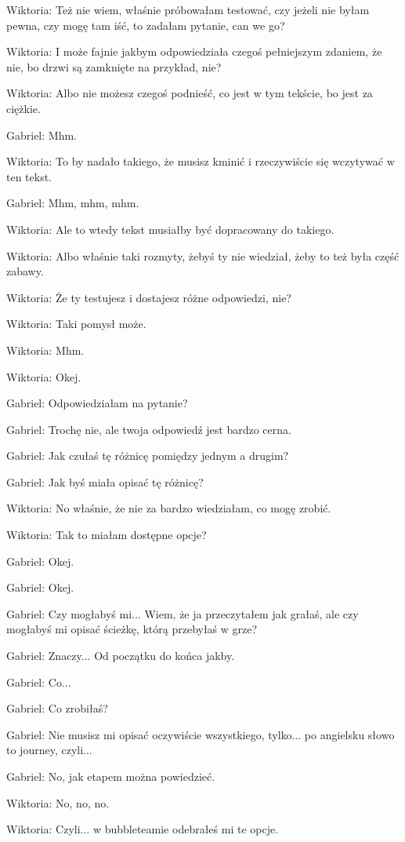 Wiktoria: Też nie wiem, właśnie próbowałam testować, czy jeżeli nie byłam pewna, czy mogę tam iść, to zadałam pytanie, can we go?

Wiktoria: I może fajnie jakbym odpowiedziała czegoś pełniejszym zdaniem, że nie, bo drzwi są zamknięte na przykład, nie?

Wiktoria: Albo nie możesz czegoś podnieść, co jest w tym tekście, bo jest za ciężkie.

Gabriel: Mhm.

Wiktoria: To by nadało takiego, że musisz kminić i rzeczywiście się wczytywać w ten tekst.

Gabriel: Mhm, mhm, mhm.

Wiktoria: Ale to wtedy tekst musiałby być dopracowany do takiego.

Wiktoria: Albo właśnie taki rozmyty, żebyś ty nie wiedział, żeby to też była część zabawy.

Wiktoria: Że ty testujesz i dostajesz różne odpowiedzi, nie?

Wiktoria: Taki pomysł może.

Wiktoria: Mhm.

Wiktoria: Okej.

Gabriel: Odpowiedziałam na pytanie?

Gabriel: Trochę nie, ale twoja odpowiedź jest bardzo cerna.

Gabriel: Jak czułaś tę różnicę pomiędzy jednym a drugim?

Gabriel: Jak byś miała opisać tę różnicę?

Wiktoria: No właśnie, że nie za bardzo wiedziałam, co mogę zrobić.

Wiktoria: Tak to miałam dostępne opcje?

Gabriel: Okej.

Gabriel: Okej.

Gabriel: Czy mogłabyś mi... Wiem, że ja przeczytałem jak grałaś, ale czy mogłabyś mi opisać ścieżkę, którą przebyłaś w grze?

Gabriel: Znaczy... Od początku do końca jakby.

Gabriel: Co...

Gabriel: Co zrobiłaś?

Gabriel: Nie musisz mi opisać oczywiście wszystkiego, tylko... po angielsku słowo to journey, czyli...

Gabriel: No, jak etapem można powiedzieć.

Wiktoria: No, no, no.

Wiktoria: Czyli... w bubbleteamie odebrałeś mi te opcje.


